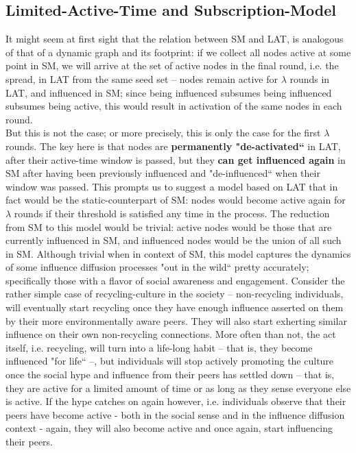 \documentclass[twocolumn, 10pt]{article}
\begin{document}
\subsection{Limited-Active-Time and Subscription-Model}
It might seem at first sight that the relation between SM and LAT, is analogous of that of a dynamic graph and its footprint: if we collect all nodes active at some point in SM, we will arrive at the set of active nodes in the final round, i.e. the spread, in LAT from the same seed set -- nodes remain active for $\lambda$ rounds in LAT, and influenced in SM; since being influenced subsumes being influenced subsumes being active, this would result in activation of the same nodes in each round. \\  
But this is not the case; or more precisely, this is only the case for the first $\lambda$ rounds. The key here is that nodes are \textbf{permanently "de-activated``} in LAT, after their active-time window is passed, but they \textbf{can get influenced again} in SM after having been previously influenced and "de-influenced`` when their window was passed. This prompts us to suggest a model based on LAT that in fact would be the static-counterpart of SM: nodes would become active again for $\lambda$ rounds if their threshold is satisfied any time in the process. The reduction from SM to this model would be trivial: active nodes would be those that are currently influenced in SM, and influenced nodes would be the union of all such in SM. Although trivial when in context of SM, this model captures the dynamics of some influence diffusion processes "out in the wild`` pretty accurately; specifically those with a flavor of social awareness and engagement. Consider the rather simple case of recycling-culture in the society -- non-recycling individuals, will eventually start recycling once they have enough influence asserted on them by their more environmentally aware peers. They will also start exherting similar influence on their own non-recycling connections. More often than not, the act itself, i.e. recycling, will turn into a life-long habit -- that is, they become influenced "for life`` --, but individuals will stop actively promoting the culture once the social hype and influence from their peers has settled down -- that is, they are active for a limited amount of time or as long as they sense everyone else is active. If the hype catches on again however, i.e. individuals observe that their peers have become active - both in the social sense and in the influence diffusion context - again, they will also become active and once again, start influencing their peers. \\
\end{document}
